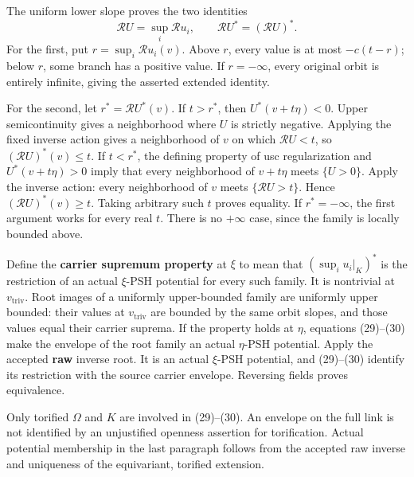 \documentclass[
  10pt,
]{article}
\begin{document}
The uniform lower slope proves the two identities \[
        \mathcal R U=\sup_i\mathcal R u_i,
        \qquad \mathcal R U^*=(\mathcal R U)^*.                        \tag{30}
\] For the first, put \(r=\sup_i\mathcal R u_i(v)\). Above \(r\), every
value is at most \(-c(t-r)\); below \(r\), some branch has a positive
value. If \(r=-\infty\), every original orbit is entirely infinite,
giving the asserted extended identity.

For the second, let \(r^*=\mathcal R U^*(v)\). If \(t>r^*\), then
\(U^*(v+t\eta)<0\). Upper semicontinuity gives a neighborhood where
\(U\) is strictly negative. Applying the fixed inverse action gives a
neighborhood of \(v\) on which \(\mathcal R U<t\), so
\((\mathcal R U)^*(v)\leq t\). If \(t<r^*\), the defining property of
usc regularization and \(U^*(v+t\eta)>0\) imply that every neighborhood
of \(v+t\eta\) meets \(\{U>0\}\). Apply the inverse action: every
neighborhood of \(v\) meets \(\{\mathcal R U>t\}\). Hence
\((\mathcal R U)^*(v)\geq t\). Taking arbitrary such \(t\) proves
equality. If \(r^*=-\infty\), the first argument works for every real
\(t\). There is no \(+\infty\) case, since the family is locally bounded
above.

Define the \textbf{carrier supremum property} at \(\xi\) to mean that
\((\sup_i u_i|_K)^*\) is the restriction of an actual \(\xi\)-PSH
potential for every such family. It is nontrivial at
\(v_{\mathrm{triv}}\). Root images of a uniformly upper-bounded family
are uniformly upper bounded: their values at \(v_{\mathrm{triv}}\) are
bounded by the same orbit slopes, and those values equal their carrier
suprema. If the property holds at \(\eta\), equations (29)--(30) make
the envelope of the root family an actual \(\eta\)-PSH potential. Apply
the accepted \textbf{raw} inverse root. It is an actual \(\xi\)-PSH
potential, and (29)--(30) identify its restriction with the source
carrier envelope. Reversing fields proves equivalence.

Only torified \(\Omega\) and \(K\) are involved in (29)--(30). An
envelope on the full link is not identified by an unjustified openness
assertion for torification. Actual potential membership in the last
paragraph follows from the accepted raw inverse and uniqueness of the
equivariant, torified extension.
\end{document}
